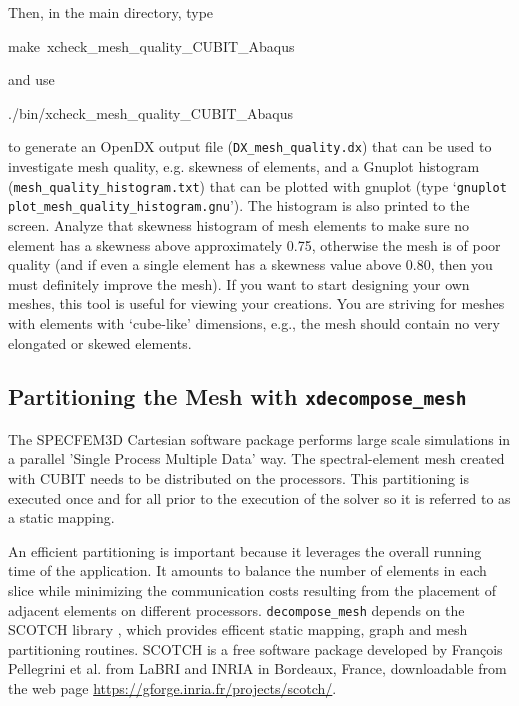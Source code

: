 \noindent
Then, in the main directory, type
\begin{lyxcode}
{\small make~xcheck\_mesh\_quality\_CUBIT\_Abaqus}{\small \par}
\end{lyxcode}
and use
\begin{lyxcode}
{\small ./bin/xcheck\_mesh\_quality\_CUBIT\_Abaqus}{\small \par}
\end{lyxcode}
to generate an %
OpenDX output file (\texttt{\small DX\_mesh\_quality.dx}{\small )
that can be used to investigate mesh quality, e.g. skewness of elements,
and a Gnuplot histogram (}\texttt{\small mesh\_quality\_histogram.txt}{\small )
that can be plotted with gnuplot (type `}\texttt{\small gnuplot plot\_mesh\_quality\_histogram.gnu}{\small ').
The histogram is also printed to the screen. Analyze that skewness
histogram of mesh elements to make sure no element has a skewness
above approximately 0.75, otherwise the mesh is of poor quality (and
if even a single element has a skewness value above 0.80, then you
must definitely improve the mesh). If you want to start designing
your own meshes, this tool is useful for viewing your creations. You
are striving for meshes with elements with `cube-like' dimensions,
e.g., the mesh should contain no very elongated or skewed elements.}{\small \par}


\subsection{Partitioning the Mesh with \texttt{xdecompose\_mesh}}

The SPECFEM3D Cartesian software package performs large scale simulations
in a parallel 'Single Process Multiple Data' way. The spectral-element
mesh created with CUBIT needs to be distributed on the processors.
This partitioning is executed once and for all prior to the execution
of the solver so it is referred to as a static mapping.

An efficient partitioning is important because it leverages the overall
running time of the application. It amounts to balance the number
of elements in each slice while minimizing the communication costs
resulting from the placement of adjacent elements on different processors.
\texttt{decompose\_mesh} depends on the SCOTCH library \citep{PeRo96},
which provides efficent static mapping, graph and mesh partitioning
routines. SCOTCH is a free software package developed by Fran\c{c}ois
Pellegrini et al. from LaBRI and INRIA in Bordeaux, France, downloadable
from the web page \url{https://gforge.inria.fr/projects/scotch/}.
\\


